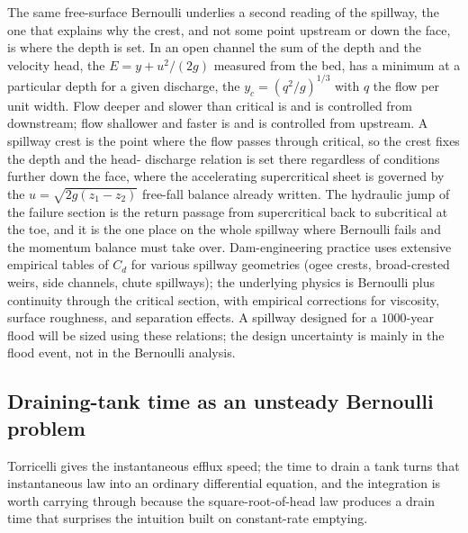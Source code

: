 The same free-surface Bernoulli underlies a second reading of the
spillway, the one that explains why the crest, and not some point
upstream or down the face, is where the depth is set. In an open channel
the sum of the depth and the velocity head, the  $E = y + u^2/(2g)$ measured from the bed, has a minimum at a
particular depth for a given discharge, the 
$y_c = (q^2/g)^{1/3}$ with $q$ the flow per unit width. Flow deeper and
slower than critical is  and is controlled from
downstream; flow shallower and faster is  and is
controlled from upstream. A spillway crest is the point where the flow
passes through critical, so the crest fixes the depth and the head-
discharge relation is set there regardless of conditions further down
the face, where the accelerating supercritical sheet is governed by the
$u = \sqrt{2g(z_1 - z_2)}$ free-fall balance already written. The
hydraulic jump of the failure section is the return passage from
supercritical back to subcritical at the toe, and it is the one place on
the whole spillway where Bernoulli fails and the momentum balance must
take over. Dam-engineering practice uses extensive empirical tables of
$C_d$ for various spillway geometries (ogee crests, broad-crested weirs,
side channels, chute spillways); the underlying physics is Bernoulli
plus continuity through the critical section, with empirical corrections
for viscosity, surface roughness, and separation effects. A spillway
designed for a $1000$-year flood will be sized using these relations;
the design uncertainty is mainly in the flood event, not in the
Bernoulli analysis.

\subsection{Draining-tank time as an unsteady Bernoulli problem}

Torricelli gives the instantaneous efflux speed; the time to drain a
tank turns that instantaneous law into an ordinary differential
equation, and the integration is worth carrying through because the
square-root-of-head law produces a drain time that surprises the
intuition built on constant-rate emptying.




